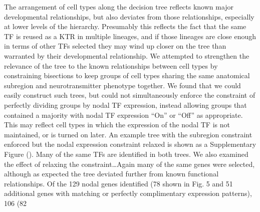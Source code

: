 The arrangement of cell types along the decision tree reflects known major developmental relationships, but also deviates from those relationships, especially at lower levels of the hierarchy. Presumably this reflects the fact that the same TF is reused as a KTR in multiple lineages, and if those lineages are close enough in terms of other TFs selected they may wind up closer on the tree than warranted by their developmental relationship. We attempted to strengthen the relevance of the tree to the known relationships between cell types by constraining bisections to keep groups of cell types sharing the same anatomical subregion and neurotransmitter phenotype together. We found that we could easily construct such trees, but could not simultaneously enforce the constraint of perfectly dividing groups by nodal TF expression, instead allowing groups that contained a majority with nodal TF expression “On” or “Off” as appropriate. This may reflect cell types in which the expression of the nodal TF is not maintained, or is turned on later. An example tree with the subregion constraint enforced but the nodal expression constraint relaxed is shown as a Supplementary Figure (). Many of the same TFs are identified in both trees. We also examined the effect of relaxing the constraint…Again many of the same genes were selected, although as expected the tree deviated further from known functional relationships. Of the 129 nodal genes identified (78 shown in Fig. 5 and 51 additional genes with matching or perfectly complimentary expression patterns), 106 (82%
